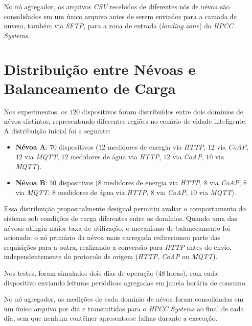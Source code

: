 No nó agregador, os arquivos \textit{CSV} recebidos de diferentes nós de névoa são consolidados em um único arquivo antes de serem enviados para a camada de nuvem, também via \textit{SFTP}, para a zona de entrada (\textit{landing zone}) do \textit{HPCC Systems}.

\section{Distribuição entre Névoas e Balanceamento de Carga}

Nos experimentos, os \(120\) dispositivos foram distribuídos entre dois domínios de névoa distintos, representando diferentes regiões no cenário de cidade inteligente.  
A distribuição inicial foi a seguinte:

\begin{itemize}
    \item \textbf{Névoa A}: \(70\) dispositivos  
    (\(12\) medidores de energia via \textit{HTTP}, \(12\) via \textit{CoAP}, \(12\) via \textit{MQTT}, \(12\) medidores de água via \textit{HTTP}, \(12\) via \textit{CoAP}, \(10\) via \textit{MQTT}).
    \item \textbf{Névoa B}: \(50\) dispositivos  
    (\(8\) medidores de energia via \textit{HTTP}, \(8\) via \textit{CoAP}, \(8\) via \textit{MQTT}, \(8\) medidores de água via \textit{HTTP}, \(8\) via \textit{CoAP}, \(10\) via \textit{MQTT}).
\end{itemize}

Essa distribuição propositalmente desigual permitiu avaliar o comportamento do sistema sob condições de carga diferentes entre os domínios.  
Quando uma das névoas atingiu maior taxa de utilização, o mecanismo de balanceamento foi acionado: o nó primário da névoa mais carregada redirecionou parte das requisições para a outra, realizando a conversão para \textit{HTTP} antes do envio, independentemente do protocolo de origem (\textit{HTTP}, \textit{CoAP} ou \textit{MQTT}).

Nos testes, foram simulados dois dias de operação (\(48\ \text{horas}\)), com cada dispositivo enviando leituras periódicas agregadas em janela horária de consumo.

No nó agregador, as medições de cada domínio de névoa foram consolidadas em um único arquivo por dia e transmitidas para o \textit{HPCC Systems} ao final de cada dia, sem que nenhum contêiner apresentasse falhas durante a execução.

